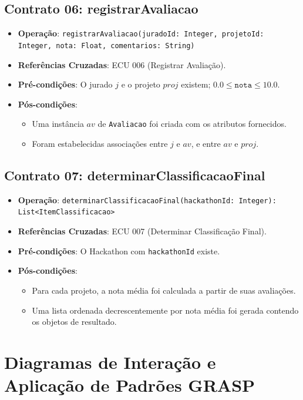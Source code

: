 \documentclass[12pt]{article}
\begin{document}
\subsection{Contrato 06: registrarAvaliacao}
\begin{itemize}
    \item \textbf{Operação}: \texttt{registrarAvaliacao(juradoId: Integer, projetoId: Integer, nota: Float, comentarios: String)}
    \item \textbf{Referências Cruzadas}: ECU 006 (Registrar Avaliação).
    \item \textbf{Pré-condições}: O jurado $j$ e o projeto $proj$ existem; $0.0 \le \texttt{nota} \le 10.0$.
    \item \textbf{Pós-condições}:
    \begin{itemize}
        \item Uma instância $av$ de \texttt{Avaliacao} foi criada com os atributos fornecidos.
        \item Foram estabelecidas associações entre $j$ e $av$, e entre $av$ e $proj$.
    \end{itemize}
\end{itemize}

\subsection{Contrato 07: determinarClassificacaoFinal}
\begin{itemize}
    \item \textbf{Operação}: \texttt{determinarClassificacaoFinal(hackathonId: Integer): List<ItemClassificacao>}
    \item \textbf{Referências Cruzadas}: ECU 007 (Determinar Classificação Final).
    \item \textbf{Pré-condições}: O Hackathon com \texttt{hackathonId} existe.
    \item \textbf{Pós-condições}:
    \begin{itemize}
        \item Para cada projeto, a nota média foi calculada a partir de suas avaliações.
        \item Uma lista ordenada decrescentemente por nota média foi gerada contendo os objetos de resultado.
    \end{itemize}
\end{itemize}

\section{Diagramas de Interação e Aplicação de Padrões GRASP}
\end{document}
